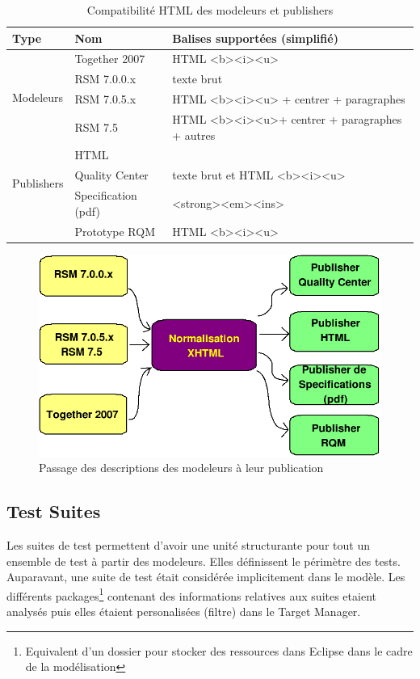 \begin{table}[!ht]
\caption{\label{tableau:compatDescHTML}Compatibilité HTML des modeleurs et publishers}
\begin{tabular}{|l|l|l|}
  \hline
  Type & Nom & Balises supportées (simplifié) \\
  \hline
  \hline
  \multirow{4}{*}{Modeleurs} & Together 2007 & HTML <b><i><u> \\
    & RSM 7.0.0.x & texte brut\\
    & RSM 7.0.5.x & HTML <b><i><u> + centrer + paragraphes\\ 
   & RSM 7.5 &  HTML <b><i><u>+ centrer + paragraphes + autres\\ \hline
  \multirow{3}{*}{Publishers} & HTML &  \\
    & Quality Center & texte brut et HTML <b><i><u> \\
    & Specification (pdf) & <strong><em><ins>  \\
    & Prototype RQM &  HTML <b><i><u> \\ \hline
\end{tabular}
\end{table}


\begin{figure}[!ht]
\centering
\includegraphics[scale=0.5]{Illustrations/bigDescSchema.png}
\caption{Passage des descriptions des modeleurs à leur publication}
\label{figure:descXHTMLPublisher}
\end{figure}

\subsection{Test Suites}
Les suites de test permettent d'avoir une unité structurante pour tout un ensemble de test à partir des modeleurs. Elles définissent le périmètre des tests. Auparavant, une suite de test était considérée implicitement dans le modèle. Les différents packages\footnote{Equivalent d'un dossier pour stocker des ressources dans Eclipse dans le cadre de la modélisation} contenant des informations relatives aux suites etaient analysés puis elles étaient personalisées (filtre) dans le Target Manager. 

